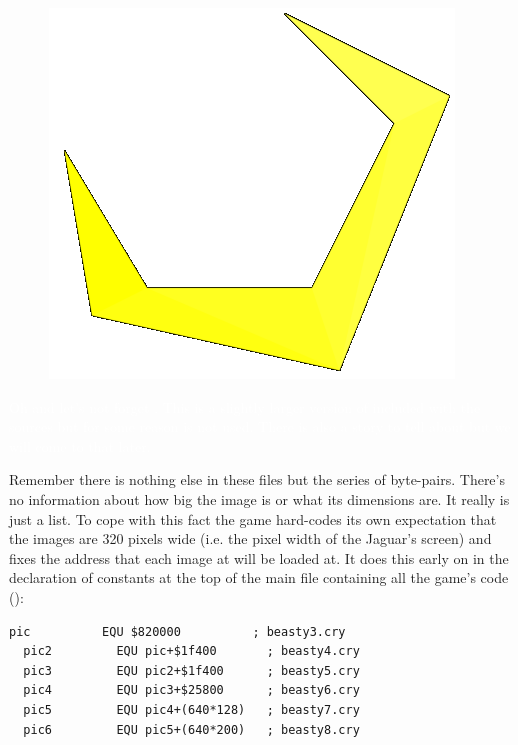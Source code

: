 \begin{definition}
\setlength{\intextsep}{0pt}%
\setlength{\columnsep}{3pt}%
\begin{figure}
\includegraphics[width=\linewidth]{src/callout/clawt2k_t.png} 
\end{figure}
\small
\textcolor{white}{
  Oh and let's not forget . This is a slightly larger version of  included with the sources
  but for some reason is not used. There is also a story to tell about  but we will come to that later.
}
\end{definition}

Remember there is nothing else in these files but the series of byte-pairs. There's no information about how big the image is or what
its dimensions are. It really is just a list. To cope with this fact the game hard-codes its own expectation that the
images are 320 pixels wide (i.e. the pixel width of the Jaguar's screen) and fixes the address that each image at will be loaded at.
It does this early on in the declaration of constants at the top of the main file containing all the game's code ():

\begin{lstlisting}[escapechar=\%]
  pic          EQU $820000          ; beasty3.cry
  pic2         EQU pic+$1f400       ; beasty4.cry
  pic3         EQU pic2+$1f400      ; beasty5.cry
  pic4         EQU pic3+$25800      ; beasty6.cry
  pic5         EQU pic4+(640*128)   ; beasty7.cry
  pic6         EQU pic5+(640*200)   ; beasty8.cry
\end{lstlisting}


